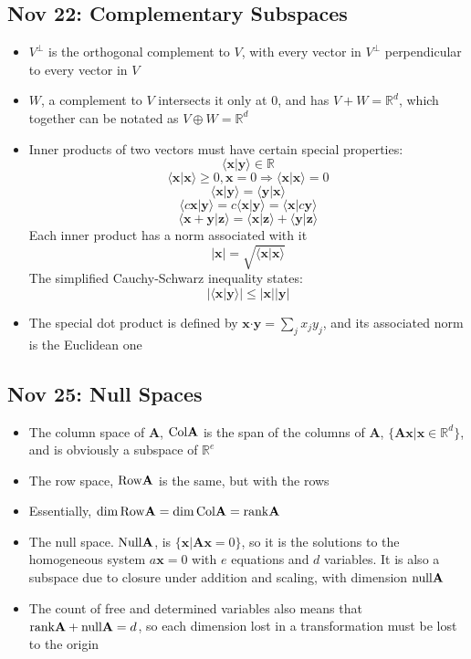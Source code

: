 \documentclass[10pt, oneside]{article}
\let\leq\leqslant
\let\geq\geqslant
\newcommand{\R}{\mathbb{R}}
\newcommand{\Cdot}{\boldsymbol{\cdot}}
\renewcommand{\vec}[1]{\mathbf{#1}}
\newcommand{\mat}[1]{\mathbf{#1}}
\begin{document}
\subsection{Nov 22: Complementary Subspaces}
\begin{itemize}
    \item $V^\perp$ is the orthogonal complement to $V$, with every vector in $V^\perp$ perpendicular to every vector in $V$
    \item $W$, a complement to $V$ intersects it only at $0$, and has $V + W = \R^d$, which together can be notated as $V \oplus W = \R^d$
    \item Inner products of two vectors must have certain special properties:
        \[\langle\vec{x}|\vec{y}\rangle \in \R\]
        \[\langle\vec{x}|\vec{x}\rangle \geq 0, \vec{x} = 0 \Rightarrow \langle\vec{x}|\vec{x}\rangle = 0 \]
        \[\langle\vec{x}|\vec{y}\rangle = \langle\vec{y}|\vec{x}\rangle\]
        \[\langle c\vec{x}|\vec{y}\rangle = c\langle\vec{x}|\vec{y}\rangle = \langle\vec{x}|c\vec{y}\rangle\]
        \[\langle\vec{x} + \vec{y}|\vec{z}\rangle = \langle\vec{x}|\vec{z}\rangle + \langle\vec{y}|\vec{z}\rangle\]
        Each inner product has a norm associated with it
        \[|\vec{x}| = \sqrt{\langle\vec{x}|\vec{x}\rangle}\]
        The simplified Cauchy-Schwarz inequality states:
        \[|\langle \vec{x} | \vec{y} \rangle | \leq |\vec{x}||\vec{y}|\]
    \item The special dot product is defined by $\vec{x} \Cdot \vec{y} = \sum_{j}x_j y_j$, and its associated norm is the Euclidean one
\end{itemize}

\subsection{Nov 25: Null Spaces}
\begin{itemize}
    \item The column space of $\mat{A}$, ${\rm Col} \mat{A}$ is the span of the columns of $\mat{A}$, $\{\mat{A}\vec{x}|\vec{x} \in \R^d\}$, and is obviously a subspace of $\R^e$
    \item The row space, ${\rm Row} \mat{A}$ is the same, but with the rows
    \item Essentially, $\dim {\rm Row} \mat{A} = \dim {\rm Col} \mat{A} = {\rm rank} \mat{A}$
    \item The null space. ${\rm Null} \mat{A}$, is $\{\vec{x}|\mat{A}\vec{x} = 0\}$, so it is the solutions to the homogeneous system $a\vec{x} = 0$ with $e$ equations and $d$ variables. It is also a subspace due to closure under addition and scaling, with dimension ${\rm null} \mat{A}$
    \item The count of free and determined variables also means that ${\rm rank} \mat{A} + {\rm null} \mat{A} = d$, so each dimension lost in a transformation must be lost to the origin
\end{itemize} 
\end{document}
